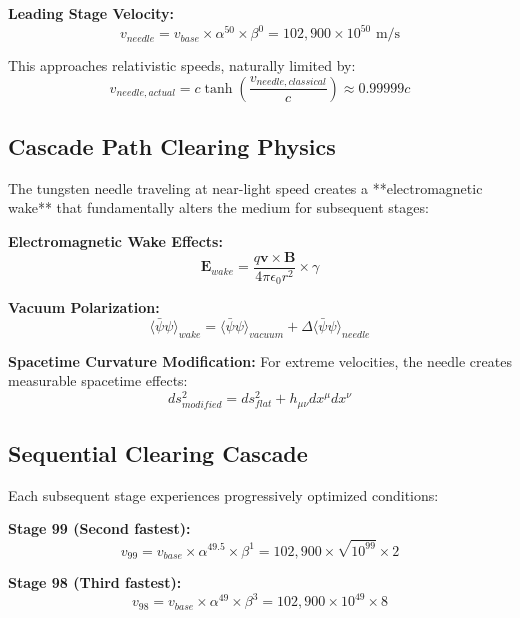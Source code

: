 \documentclass[12pt,a4paper]{article}
\begin{document}
\textbf{Leading Stage Velocity:}
\begin{equation}
v_{needle} = v_{base} \times \alpha^{50} \times \beta^{0} = 102,900 \times 10^{50} \text{ m/s}
\end{equation}

This approaches relativistic speeds, naturally limited by:
\begin{equation}
v_{needle,actual} = c \tanh\left(\frac{v_{needle,classical}}{c}\right) \approx 0.99999c
\end{equation}

\subsection{Cascade Path Clearing Physics}

The tungsten needle traveling at near-light speed creates a **electromagnetic wake** that fundamentally alters the medium for subsequent stages:

\textbf{Electromagnetic Wake Effects:}
\begin{equation}
\mathbf{E}_{wake} = \frac{q\mathbf{v} \times \mathbf{B}}{4\pi\epsilon_0 r^2} \times \gamma
\end{equation}

\textbf{Vacuum Polarization:}
\begin{equation}
\langle\bar{\psi}\psi\rangle_{wake} = \langle\bar{\psi}\psi\rangle_{vacuum} + \Delta\langle\bar{\psi}\psi\rangle_{needle}
\end{equation}

\textbf{Spacetime Curvature Modification:}
For extreme velocities, the needle creates measurable spacetime effects:
\begin{equation}
ds^2_{modified} = ds^2_{flat} + h_{\mu\nu}dx^\mu dx^\nu
\end{equation}

\subsection{Sequential Clearing Cascade}

Each subsequent stage experiences progressively optimized conditions:

\textbf{Stage 99 (Second fastest):}
\begin{equation}
v_{99} = v_{base} \times \alpha^{49.5} \times \beta^{1} = 102,900 \times \sqrt{10^{99}} \times 2
\end{equation}

\textbf{Stage 98 (Third fastest):}
\begin{equation}
v_{98} = v_{base} \times \alpha^{49} \times \beta^{3} = 102,900 \times 10^{49} \times 8
\end{equation}
\end{document}
